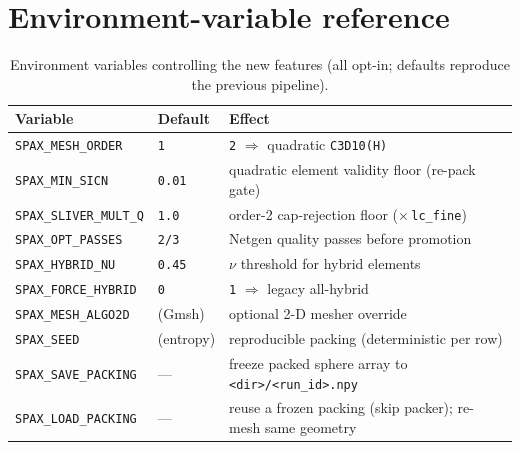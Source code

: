 \documentclass[11pt]{article}
\newcommand{\code}[1]{\texttt{\small #1}}
\newcommand{\env}[1]{\texttt{\small #1}}
\begin{document}
\section{Environment-variable reference}
\begin{table}[h]
\centering
\small
\begin{tabular}{@{}lll@{}}
\toprule
\textbf{Variable} & \textbf{Default} & \textbf{Effect}\\
\midrule
\env{SPAX\_MESH\_ORDER}     & \code{1} & \code{2} $\Rightarrow$ quadratic \code{C3D10(H)}\\
\env{SPAX\_MIN\_SICN}       & \code{0.01} & quadratic element validity floor (re-pack gate)\\
\env{SPAX\_SLIVER\_MULT\_Q} & \code{1.0} & order-2 cap-rejection floor ($\times$\,\code{lc\_fine})\\
\env{SPAX\_OPT\_PASSES}     & \code{2/3} & Netgen quality passes before promotion\\
\env{SPAX\_HYBRID\_NU}      & \code{0.45} & $\nu$ threshold for hybrid elements\\
\env{SPAX\_FORCE\_HYBRID}   & \code{0} & \code{1} $\Rightarrow$ legacy all-hybrid\\
\env{SPAX\_MESH\_ALGO2D}    & (Gmsh) & optional 2-D mesher override\\
\env{SPAX\_SEED}            & (entropy) & reproducible packing (deterministic per row)\\
\env{SPAX\_SAVE\_PACKING}   & --- & freeze packed sphere array to \code{<dir>/<run\_id>.npy}\\
\env{SPAX\_LOAD\_PACKING}   & --- & reuse a frozen packing (skip packer); re-mesh same geometry\\
\bottomrule
\end{tabular}
\caption{Environment variables controlling the new features (all opt-in;
defaults reproduce the previous pipeline).}
\label{tab:env}
\end{table}

\end{document}

